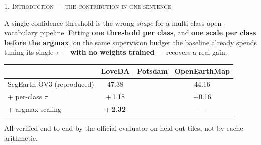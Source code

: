 \documentclass[aspectratio=169]{beamer}
\newcommand{\best}[1]{\textcolor{acc}{\textbf{#1}}}
\begin{document}
\begin{frame}{\textsc{1. Introduction --- the contribution in one sentence}}
\begin{block}{}
A single confidence threshold is the wrong \emph{shape} for a multi-class
open-vocabulary pipeline. Fitting \best{one threshold per class}, and
\best{one scale per class before the argmax}, on the same supervision budget the
baseline already spends tuning its single $\tau$ --- \best{with no weights
trained} --- recovers a real gain.
\end{block}
\vspace{0.8em}
\begin{center}\small
\begin{tabular}{lccc}
\toprule
 & LoveDA & Potsdam & OpenEarthMap \\
\midrule
SegEarth-OV3 (reproduced) & 47.38 & \eePotsA{} & 44.16 \\
\;+ per-class $\tau$        & \multicolumn{1}{c}{$+$\,1.18} & \eePotsB{} & $+$0.16 \\
\;+ argmax scaling          & \best{$+$\,2.32} & \best{\eePotsC{}} & --- \\
\bottomrule
\end{tabular}
\end{center}
\vspace{0.6em}
\footnotesize All verified end-to-end by the official evaluator on held-out
tiles, not by cache arithmetic.
\end{frame}

\end{document}
